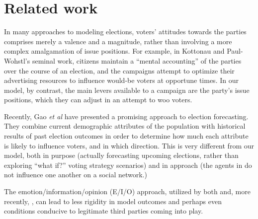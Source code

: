 \section{Related work}
\label{sec:related}


In many approaches to modeling elections, voters' attitudes towards the parties
comprises merely a valence and a magnitude, rather than involving a more
complex amalgamation of issue positions. For example, in Kottonau and
Paul-Wohstl's seminal work\cite{kottonau_simulating_2004}, citizens maintain
a ``mental accounting'' of the parties over the course of an election, and the
campaigns attempt to optimize their advertising resources to influence would-be
voters at opportune times. In our model, by contrast, the main levers available
to a campaign are the party's issue positions, which they can adjust in an
attempt to woo voters.

Recently, Gao \textit{et al}\cite{gao_forecasting_2022} have presented a
promising approach to election forecasting. They combine current demographic
attributes of the population with historical results of past election outcomes
in order to determine how much each attribute is likely to influence voters,
and in which direction. This is very different from our model, both in purpose
(actually forecasting upcoming elections, rather than exploring ``what if?''
voting strategy scenarios) and in approach (the agents in
\cite{gao_forecasting_2022} do not influence one another on a social network.)

The emotion/information/opinion (E/I/O) approach, utilized by both
\cite{sobkowicz_quantitative_2016} and, more recently,
\cite{burke_quantitatively_2022}, can lead to less rigidity in model outcomes
and perhaps even conditions conducive to legitimate third parties coming into
play.
